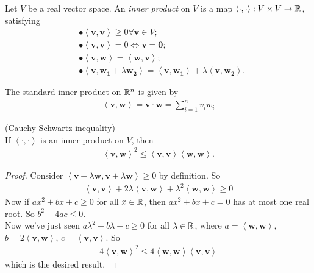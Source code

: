 \documentclass[a4paper]{article}
\begin{document}
\begin{defi}
Let $V$ be a real vector space. An \emph{inner product} on $V$ is a map $\left<\cdot, \cdot\right>: V\times V \to \mathbb{R}$, satisfying
\begin{equation*}
\begin{aligned}
&\bullet \left<\mathbf{v},\mathbf{v}\right> \geq 0 \forall \mathbf{v}\in V;\\
&\bullet \left<\mathbf{v},\mathbf{v}\right> = 0 \iff \mathbf{v}=\mathbf{0};\\
&\bullet \left<\mathbf{v},\mathbf{w}\right> = \left<\mathbf{w},\mathbf{v}\right>;\\
&\bullet \left<\mathbf{v},\mathbf{w_1}+\lambda \mathbf{w_2}\right> = \left<\mathbf{v},\mathbf{w_1}\right> + \lambda\left<\mathbf{v},\mathbf{w_2}\right>.
\end{aligned}
\end{equation*}
\end{defi}

The standard inner product on $\mathbb{R}^n$ is given by
\begin{equation*}
\begin{aligned}
\left<\mathbf{v},\mathbf{w}\right> = \mathbf{v}\cdot\mathbf{w}=\sum_{i=1}^n v_i w_i
\end{aligned}
\end{equation*}

\begin{thm} (Cauchy-Schwartz inequality)\\
If $\left<\cdot,\cdot\right>$ is an inner product on $V$, then
\begin{equation*}
\begin{aligned}
\left<\mathbf{v},\mathbf{w}\right>^2 \leq \left<\mathbf{v},\mathbf{v}\right>\left<\mathbf{w},\mathbf{w}\right>.
\end{aligned}
\end{equation*}
\begin{proof}
Consider $\left<\mathbf{v}+\lambda\mathbf{w},\mathbf{v}+\lambda\mathbf{w}\right>\geq 0$ by definition. So
\begin{equation*}
\begin{aligned}
\left<\mathbf{v},\mathbf{v}\right> + 2\lambda\left<\mathbf{v},\mathbf{w}\right>+\lambda^2\left<\mathbf{w},\mathbf{w}\right> \geq 0
\end{aligned}
\end{equation*}
Now if $ax^2 + bx + c\geq 0$ for all $x\in \mathbb{R}$, then $ax^2+bx+c=0$ has at most one real root. So $b^2-4ac \leq 0$.\\
Now we've just seen $a\lambda^2+b\lambda+c\geq 0$ for all $\lambda\in\mathbb{R}$, where $a=\left<\mathbf{w},\mathbf{w}\right>$, $b=2\left<\mathbf{v},\mathbf{w}\right>$, $c=\left<\mathbf{v},\mathbf{v}\right>$. So
\begin{equation*}
\begin{aligned}
4\left<\mathbf{v},\mathbf{w}\right>^2 \leq 4\left<\mathbf{w},\mathbf{w}\right>\left<\mathbf{v},\mathbf{v}\right>
\end{aligned}
\end{equation*}
which is the desired result.
\end{proof}
\end{thm}
\end{document}
